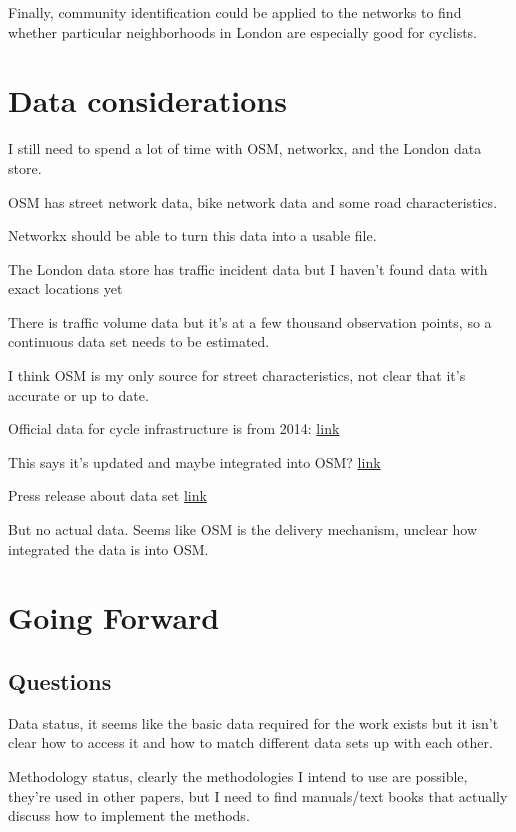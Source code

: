 \documentclass[11pt]{article} %
\begin{document}
Finally, community identification could be applied to the networks to find whether particular neighborhoods in London are especially good for cyclists. 


\section{Data considerations}

I still need to spend a lot of time with OSM, networkx, and the London data store. 

OSM has street network data, bike network data and some road characteristics. 

Networkx should be able to turn this data into a usable file. 

The London data store has traffic incident data but I haven't found data with exact locations yet

There is traffic volume data but it's at a few thousand observation points, so a continuous data set needs to be estimated. 

I think OSM is my only source for street characteristics, not clear that it's accurate or up to date.


Official data for cycle infrastructure is from 2014: \href{https://data.gov.uk/dataset/47f0a282-3356-4530-8e7b-f67aaf4bec63/cycle-routes}{link}

This says it's updated and maybe integrated into OSM? \href{https://www.cyclestreets.net/blog/category/open-data/}{link}

Press release about data set \href{https://www.london.gov.uk/press-releases/mayoral/action-plan-to-get-more-londoners-cycling}{link}

But no actual data. Seems like OSM is the delivery mechanism, unclear how integrated the data is into OSM. 


\section{Going Forward}


\subsection{Questions}

Data status, it seems like the basic data required for the work exists but it isn't clear how to access it and how to match different data sets up with each other. 

Methodology status, clearly the methodologies I intend to use are possible, they're used in other papers, but I need to find manuals/text books that actually discuss how to implement the methods. 
\end{document}
